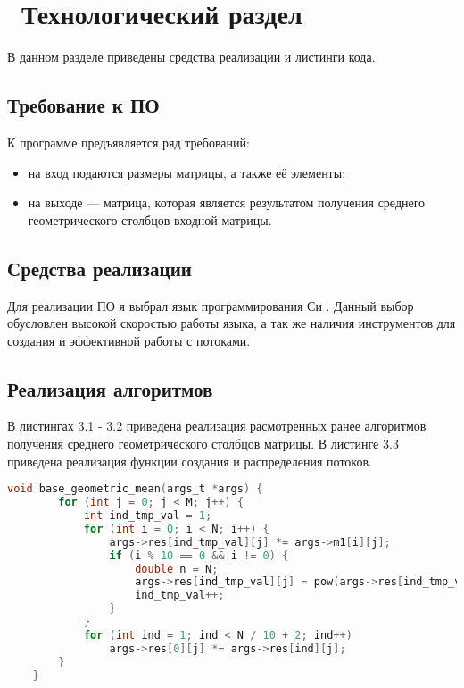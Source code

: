 \chapter{ Технологический раздел}
\label{cha:technological}

    В данном разделе приведены средства реализации и листинги кода.

    \section{Требование к ПО}
    
    К программе предъявляется ряд требований:
    
    \begin{itemize}
    	\item на вход подаются размеры матрицы, а также её элементы;
    	\item на выходе — матрица, которая является результатом получения среднего геометрического столбцов входной матрицы.
    \end{itemize}
    
    \section{Средства реализации}
    Для реализации ПО я выбрал язык программирования Си \cite{C}. Данный выбор обусловлен высокой скоростью работы языка, а так же наличия инструментов для создания и эффективной работы с потоками.
    
    \section{Реализация алгоритмов}
    
    В листингах 3.1 - 3.2 приведена реализация расмотренных ранее алгоритмов получения среднего геометрического столбцов матрицы.
    В листинге 3.3 приведена реализация функции создания и распределения потоков.
    
    \begin{lstlisting}[label=some-code,caption=Функция получения среднего геометрического столбцов матрицы обычным способом, language=C]
    void base_geometric_mean(args_t *args) {
        for (int j = 0; j < M; j++) {
            int ind_tmp_val = 1;
            for (int i = 0; i < N; i++) {
                args->res[ind_tmp_val][j] *= args->m1[i][j];
                if (i % 10 == 0 && i != 0) {
                    double n = N;
                    args->res[ind_tmp_val][j] = pow(args->res[ind_tmp_val][j], static_cast<double>(1) / n);
                    ind_tmp_val++;
                }
            }
            for (int ind = 1; ind < N / 10 + 2; ind++)
                args->res[0][j] *= args->res[ind][j];
        }
    }
    \end{lstlisting}
    
